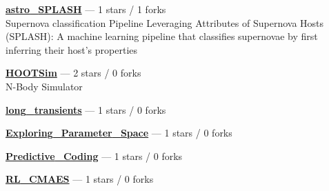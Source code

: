 \item \href{https://github.com/Adam-Boesky/astro_SPLASH}{{\bf astro{\_}SPLASH}} --- 1 stars / 1 forks \\
Supernova classification Pipeline Leveraging Attributes of Supernova Hosts (SPLASH): A machine learning pipeline that classifies supernovae by first inferring their host's properties 

\item \href{https://github.com/jdinovi/HOOTSim}{{\bf HOOTSim}} --- 2 stars / 0 forks \\
N-Body Simulator 

\item \href{https://github.com/Adam-Boesky/long_transients}{{\bf long{\_}transients}} --- 1 stars / 0 forks \\
 

\item \href{https://github.com/Adam-Boesky/Exploring_Parameter_Space}{{\bf Exploring{\_}Parameter{\_}Space}} --- 1 stars / 0 forks \\
 

\item \href{https://github.com/Adam-Boesky/Predictive_Coding}{{\bf Predictive{\_}Coding}} --- 1 stars / 0 forks \\
 

\item \href{https://github.com/Adam-Boesky/RL_CMAES}{{\bf RL{\_}CMAES}} --- 1 stars / 0 forks \\
 